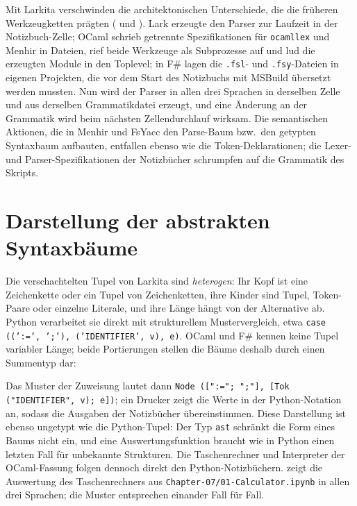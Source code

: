 Mit Larkita verschwinden die architektonischen Unterschiede, die die früheren Werkzeugketten prägten ( und ).
Lark erzeugte den Parser zur Laufzeit in der Notizbuch-Zelle; OCaml schrieb getrennte Spezifikationen für \texttt{ocamllex} und Menhir in Dateien, rief beide Werkzeuge als Subprozesse auf und lud die erzeugten Module in den Toplevel; in F\# lagen die \texttt{.fsl}- und \texttt{.fsy}-Dateien in eigenen Projekten, die vor dem Start des Notizbuchs mit MSBuild übersetzt werden mussten.
Nun wird der Parser in allen drei Sprachen in derselben Zelle und aus derselben Grammatikdatei erzeugt, und eine Änderung an der Grammatik wird beim nächsten Zellendurchlauf wirksam.
Die semantischen Aktionen, die in Menhir und FsYacc den Parse-Baum bzw.\ den getypten Syntaxbaum aufbauten, entfallen ebenso wie die Token-Deklarationen; die Lexer- und Parser-Spezifikationen der Notizbücher schrumpfen auf die Grammatik des Skripts.

\section{Darstellung der abstrakten Syntaxbäume}
\label{sec:ast_representation}

Die verschachtelten Tupel von Larkita sind \emph{heterogen}: Ihr Kopf ist eine Zeichenkette oder ein Tupel von Zeichenketten, ihre Kinder sind Tupel, Token-Paare oder einzelne Literale, und ihre Länge hängt von der Alternative ab.
Python verarbeitet sie direkt mit strukturellem Mustervergleich, etwa \texttt{case ((':=', ';'), ('IDENTIFIER', v), e)}.
OCaml und F\# kennen keine Tupel variabler Länge; beide Portierungen stellen die Bäume deshalb durch einen Summentyp dar:

Das Muster der Zuweisung lautet dann \texttt{Node ([":="; ";"], [Tok ("IDENTIFIER", v); e])}; ein Drucker zeigt die Werte in der Python-Notation an, sodass die Ausgaben der Notizbücher übereinstimmen.
Diese Darstellung ist ebenso ungetypt wie die Python-Tupel: Der Typ \texttt{ast} schränkt die Form eines Baums nicht ein, und eine Auswertungsfunktion braucht wie in Python einen letzten Fall für unbekannte Strukturen.
Die Taschenrechner und Interpreter der OCaml-Fassung folgen dennoch direkt den Python-Notizbüchern.
 zeigt die Auswertung des Taschenrechners aus \texttt{Chapter-07/01-Calculator.ipynb} in allen drei Sprachen; die Muster entsprechen einander Fall für Fall.

